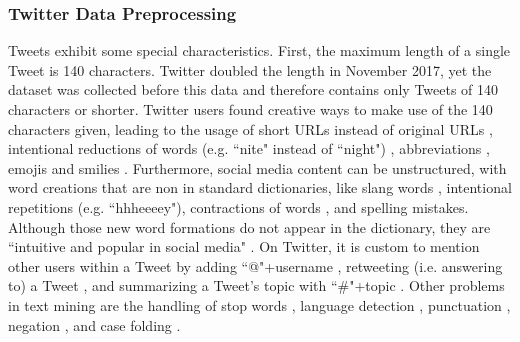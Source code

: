 \subsubsection{Twitter Data Preprocessing}
\label{subsubsec:tweet_cleaning}
Tweets exhibit some special characteristics. First, the maximum length of a single Tweet is 140 characters. Twitter doubled the length in November 2017, yet the dataset was collected before this data and therefore contains only Tweets of 140 characters or shorter. Twitter users found creative ways to make use of the 140 characters given, leading to the usage of short URLs instead of original URLs \cite{xiang2012detecting}, intentional reductions of words (e.g. ``nite" instead of ``night") \cite{xiang2012detecting}, abbreviations \cite{gupta2018proposed}, emojis \cite{ghorai2016information, watanabe2018hate} and smilies \cite{hovelmann2017fasttext, smailovic2013predictive}.\newline
Furthermore, social media content can be unstructured, with word creations that are non in standard dictionaries, like slang words \cite{gupta2018proposed, watanabe2018hate}, intentional repetitions \cite{hemalatha2012preprocessing, montani2018tuwienkbs, rother2018ulmfit, xiang2012detecting} (e.g. ``hhheeeey"), contractions of words \cite{hemalatha2012preprocessing, smailovic2013predictive}, and spelling mistakes. Although those new word formations do not appear in the dictionary, they are ``intuitive and popular in social media" \cite{hu2012text}. \newline
On Twitter, it is custom to mention other users within a Tweet by adding ``@"+username \cite{montani2018tuwienkbs, rother2018ulmfit, watanabe2018hate, xiang2012detecting}, retweeting (i.e. answering to) a Tweet \cite{hemalatha2012preprocessing, xiang2012detecting}, and summarizing a Tweet's topic with ``\#"+topic \cite{watanabe2018hate, xiang2012detecting}. \newline
Other problems in text mining are the handling of stop words \cite{ghorai2016information, gupta2018proposed, xiang2012detecting}, language detection \cite{xiang2012detecting}, punctuation \cite{ghorai2016information, hemalatha2012preprocessing, montani2018tuwienkbs}, negation \cite{watanabe2018hate}, and case folding \cite{ghorai2016information, gupta2018proposed, rother2018ulmfit}.\newline
